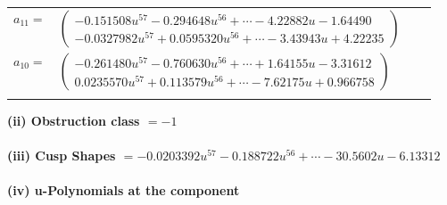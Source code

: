 \documentclass[1p]{elsarticle_modified}
\theoremstyle{definition}
\begin{document}
\begin{tabular}{m{7pt} m{180pt} m{7pt} m{180pt} }
\flushright $a_{11}=$&$\begin{pmatrix}-0.151508 u^{57}-0.294648 u^{56}+\cdots-4.22882 u-1.64490\\-0.0327982 u^{57}+0.0595320 u^{56}+\cdots-3.43943 u+4.22235\end{pmatrix}$ \\
\flushright $a_{10}=$&$\begin{pmatrix}-0.261480 u^{57}-0.760630 u^{56}+\cdots+1.64155 u-3.31612\\0.0235570 u^{57}+0.113579 u^{56}+\cdots-7.62175 u+0.966758\end{pmatrix}$\\&\end{tabular}
\flushleft \textbf{(ii) Obstruction class $= -1$}\\~\\
\flushleft \textbf{(iii) Cusp Shapes $= -0.0203392 u^{57}-0.188722 u^{56}+\cdots-30.5602 u-6.13312$}\\~\\
\newpage\renewcommand{\arraystretch}{1}
\flushleft \textbf{(iv) u-Polynomials at the component}\newline \\
\end{document}
